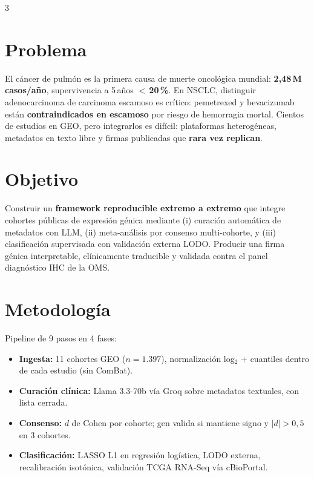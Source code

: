 \documentclass[10pt, a4paper, landscape]{article}
\begin{document}
\begin{multicols}{3}

\section{Problema}
\footnotesize
El c\'ancer de pulm\'on es la primera causa de muerte oncol\'ogica
mundial: \textbf{\textcolor{uaxdark}{2,48\,M casos/a\~no}}, supervivencia
a 5\,a\~nos \textbf{\textcolor{uaxdark}{$<$\,20\,\%}}. En NSCLC,
distinguir adenocarcinoma de carcinoma escamoso es cr\'itico: pemetrexed
y bevacizumab est\'an \textbf{contraindicados en escamoso} por riesgo de
hemorragia mortal. Cientos de estudios en GEO, pero integrarlos es
dif\'icil: plataformas heterog\'eneas, metadatos en texto libre y firmas
publicadas que \textbf{rara vez replican}.

\section{Objetivo}
\footnotesize
Construir un \textbf{\textcolor{uaxdark}{framework reproducible extremo a
extremo}} que integre cohortes p\'ublicas de expresi\'on g\'enica
mediante (i) curaci\'on autom\'atica de metadatos con LLM, (ii)
meta-an\'alisis por consenso multi-cohorte, y (iii) clasificaci\'on
supervisada con validaci\'on externa LODO. Producir una firma g\'enica
interpretable, cl\'inicamente traducible y validada contra el panel
diagn\'ostico IHC de la OMS.

\section{Metodolog\'ia}
\footnotesize
Pipeline de 9 pasos en 4 fases:
\begin{itemize}[leftmargin=1em, itemsep=1pt, topsep=1pt]
  \item \textbf{\textcolor{uaxdark}{Ingesta:}} 11 cohortes GEO
  ($n=1.397$), normalizaci\'on log$_2$ + cuantiles dentro de cada
  estudio (sin ComBat).
  \item \textbf{\textcolor{uaxdark}{Curaci\'on cl\'inica:}} Llama
  3.3-70b v\'ia Groq sobre metadatos textuales, con lista cerrada.
  \item \textbf{\textcolor{uaxdark}{Consenso:}} $d$ de Cohen por
  cohorte; gen valida si mantiene signo y $|d|>0{,}5$ en 3 cohortes.
  \item \textbf{\textcolor{uaxdark}{Clasificaci\'on:}} LASSO L1 en
  regresi\'on log\'istica, LODO externa, recalibraci\'on isot\'onica,
  validaci\'on TCGA RNA-Seq v\'ia cBioPortal.
\end{itemize}


\end{multicols}
\end{document}
